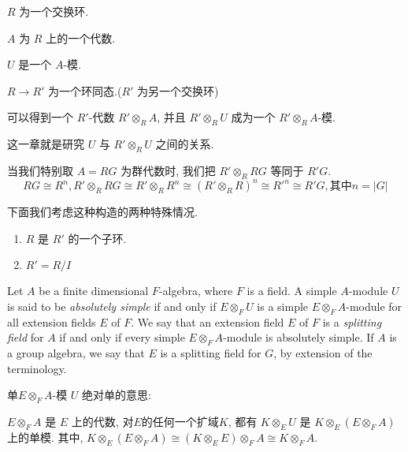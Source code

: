 \documentclass{ctexart}
\begin{document}
$R$ 为一个交换环.

$A$ 为 $R$ 上的一个代数.

$U$ 是一个 $A$-模.

$R\to R'$ 为一个环同态.($R'$ 为另一个交换环)

可以得到一个 $R'$-代数 $R'\otimes_R A$, 并且 $R'\otimes_R U$ 成为一个 $R'\otimes_R A$-模.

这一章就是研究 $U$ 与 $R'\otimes_R U$ 之间的关系.

当我们特别取 $A=RG$ 为群代数时, 我们把 $R'\otimes_R RG$ 等同于 $R'G$.
\[
RG\cong R^n,R'\otimes_R RG \cong R'\otimes_R R^n \cong (R'\otimes_R R)^n\cong R'^n\cong R'G, \text{其中} n = \lvert G\rvert
\]

下面我们考虑这种构造的两种特殊情况.
\begin{enumerate}
  \item $R$ 是 $R'$ 的一个子环.
  \item $R' = R/I$
\end{enumerate}

Let $A$ be a finite dimensional $F$-algebra, where $F$ is a field. A simple $A$-module $U$ is said to be \textit{absolutely simple} if and only if $E\otimes_F U$ is a simple $E\otimes_F A$-module for all extension fields $E$ of $F$. We say that an extension field $E$ of $F$ is a \textit{splitting field} for $A$ if and only if every simple $E\otimes_F A$-module is absolutely simple. If $A$ is a group algebra, we say that $E$ is a splitting field for $G$, by extension of the terminology.

单$E\otimes_F A$-模 $U$ 绝对单的意思:

$E\otimes_F A$ 是 $E$ 上的代数, 对$E$的任何一个扩域$K$, 都有 $K\otimes_E U$ 是 $K\otimes_E (E\otimes_F A)$ 上的单模. 其中, $K\otimes_E (E\otimes_F A) \cong (K\otimes_E E)\otimes_F A\cong K\otimes_F A$.
\end{document}
